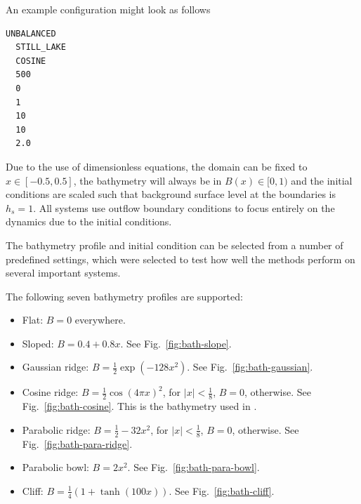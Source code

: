 An example configuration might look as follows

\begin{lstlisting}[caption=Configuration file]
  UNBALANCED
  STILL_LAKE
  COSINE
  500
  0
  1
  10
  10
  2.0
\end{lstlisting}

Due to the use of dimensionless equations, the domain can be fixed to $x \in [-0.5, 0.5]$, the bathymetry will always be in $B(x) \in [0,1)$ and the initial conditions are scaled such that background surface level at the boundaries is $h_s = 1$. All systems use outflow boundary conditions to focus entirely on the dynamics due to the initial conditions.

The bathymetry profile and initial condition can be selected from a number of predefined settings, which were selected to test how well the methods perform on several important systems.

The following seven bathymetry profiles are supported:

\begin{itemize}
  \item Flat: $B = 0$ everywhere.
  \item Sloped: $B = 0.4 + 0.8x$. See Fig.~\ref{fig:bath-slope}.
  \item Gaussian ridge: $B = \frac{1}{2} \exp (-128 x^2)$. See Fig.~\ref{fig:bath-gaussian}.
  \item Cosine ridge: $B = \frac{1}{2} \cos(4\pi x)^2$, for $|x| < \frac{1}{8}$, $B = 0$, otherwise. See Fig.~\ref{fig:bath-cosine}. This is the bathymetry used in \cite{leveque1998balancing}.
  \item Parabolic ridge: $B = \frac{1}{2} - 32x^2$, for $|x| < \frac{1}{8}$, $B = 0$, otherwise. See Fig.~\ref{fig:bath-para-ridge}.
  \item Parabolic bowl: $B = 2 x^2$. See Fig.~\ref{fig:bath-para-bowl}.
  \item Cliff: $B = \frac{1}{4} (1 + \tanh (100 x))$. See Fig.~\ref{fig:bath-cliff}.
\end{itemize}

